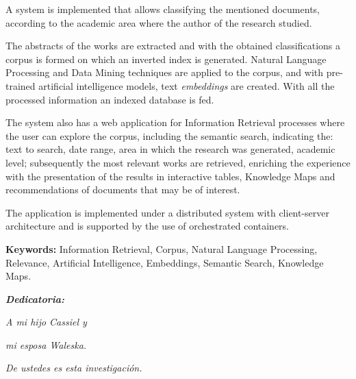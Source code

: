 \documentclass[
  12pt,
  openany]{book}
\begin{document}
A system is implemented that allows classifying the mentioned documents, according to the academic area where the author of the research studied.

The abstracts of the works are extracted and with the obtained classifications a corpus is formed on which an inverted index is generated. Natural Language Processing and Data Mining techniques are applied to the corpus, and with pre-trained artificial intelligence models, text \textit{embeddings} are created. With all the processed information an indexed database is fed.

The system also has a web application for Information Retrieval processes where the user can explore the corpus, including the semantic search, indicating the: text to search, date range, area in which the research was generated, academic level; subsequently the most relevant works are retrieved, enriching the experience with the presentation of the results in interactive tables, Knowledge Maps and recommendations of documents that may be of interest.

The application is implemented under a distributed system with client-server architecture and is supported by the use of orchestrated containers.

\vspace*{2cm}

\textbf{Keywords:} Information Retrieval, Corpus, Natural Language Processing, Relevance,  Artificial Intelligence, Embeddings, Semantic Search, Knowledge Maps.

\thispagestyle{empty}




\setlength{\abovedisplayskip}{-5pt}
\setlength{\abovedisplayshortskip}{-5pt}
\thispagestyle{empty}

\newpage
\begin{center}
\large{\textbf{\emph{\Huge{Dedicatoria:}}}}
\end{center}
\thispagestyle{empty}
\vspace*{5cm}
\thispagestyle{empty}
\begin{center} \Large \emph{A mi hijo Cassiel y  } \end{center}
\vspace*{1cm}
\begin{center} \Large \emph{mi esposa Waleska.} \end{center}
\vspace*{1cm}
\begin{center} \Large {\emph{De ustedes es esta investigación.}} \end{center}
\end{document}
